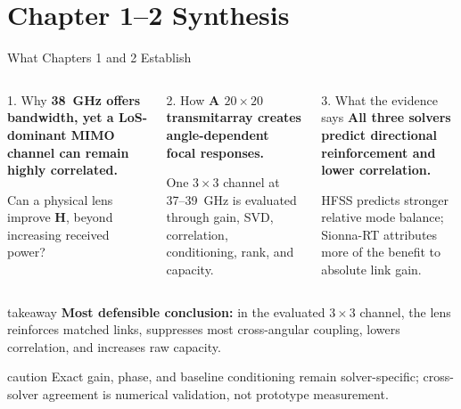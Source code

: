 
\section{Chapter 1--2 Synthesis}

\begin{frame}[t]{What Chapters 1 and 2 Establish}
\footnotesize
\begin{columns}[T,onlytextwidth]
  \begin{block}{1. Why}
    \textbf{38~GHz offers bandwidth, yet a LoS-dominant MIMO channel can remain
    highly correlated.}

    \vspace{0.10cm}
    Can a physical lens improve $\mathbf H$, beyond increasing received power?
  \end{block}

  \begin{block}{2. How}
    \textbf{A $20\times20$ transmitarray creates angle-dependent focal responses.}

    \vspace{0.10cm}
    One $3\times3$ channel at 37--39~GHz is evaluated through gain, SVD,
    correlation, conditioning, rank, and capacity.
  \end{block}

  \begin{block}{3. What the evidence says}
    \textbf{All three solvers predict directional reinforcement and lower
    correlation.}

    \vspace{0.10cm}
    HFSS predicts stronger relative mode balance; Sionna-RT attributes more of
    the benefit to absolute link gain.
  \end{block}
\end{columns}

\vspace{0.05cm}
\begin{beamercolorbox}[rounded=true,sep=0.60ex,wd=\linewidth]{takeaway}
  \centering
  \textbf{Most defensible conclusion:} in the evaluated $3\times3$ channel, the
  lens reinforces matched links, suppresses most cross-angular coupling, lowers
  correlation, and increases raw capacity.
\end{beamercolorbox}

\vspace{0cm}
\begin{beamercolorbox}[rounded=true,sep=0.45ex,wd=\linewidth]{caution}
  \scriptsize Exact gain, phase, and baseline conditioning remain solver-specific;
  cross-solver agreement is numerical validation, not prototype measurement.
\end{beamercolorbox}
\end{frame}
